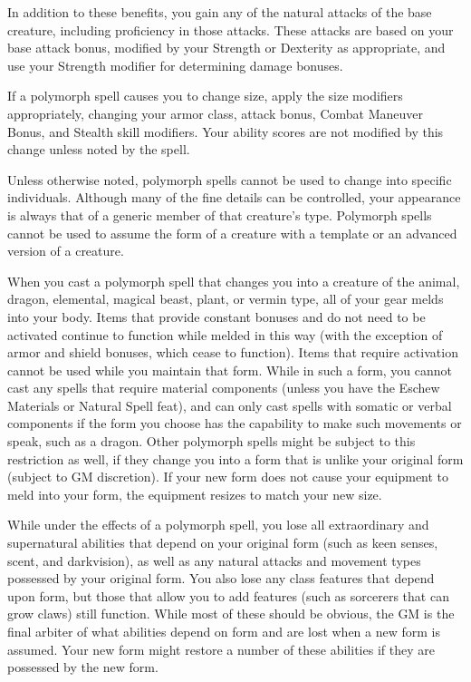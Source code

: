 In addition to these benefits, you gain any of the natural attacks of the base creature, including proficiency in those attacks. These attacks are based on your base attack bonus, modified by your Strength or Dexterity as appropriate, and use your Strength modifier for determining damage bonuses.
				
If a polymorph spell causes you to change size, apply the size modifiers appropriately, changing your armor class, attack bonus, Combat Maneuver Bonus, and Stealth skill modifiers. Your ability scores are not modified by this change unless noted by the spell.
				
Unless otherwise noted, polymorph spells cannot be used to change into specific individuals. Although many of the fine details can be controlled, your appearance is always that of a generic member of that creature's type. Polymorph spells cannot be used to assume the form of a creature with a template or an advanced version of a creature.
				
When you cast a polymorph spell that changes you into a creature of the animal, dragon, elemental, magical beast, plant, or vermin type, all of your gear melds into your body. Items that provide constant bonuses and do not need to be activated continue to function while melded in this way (with the exception of armor and shield bonuses, which cease to function). Items that require activation cannot be used while you maintain that form. While in such a form, you cannot cast any spells that require material components (unless you have the Eschew Materials or Natural Spell feat), and can only cast spells with somatic or verbal components if the form you choose has the capability to make such movements or speak, such as a dragon. Other polymorph spells might be subject to this restriction as well, if they change you into a form that is unlike your original form (subject to GM discretion). If your new form does not cause your equipment to meld into your form, the equipment resizes to match your new size. 
				
While under the effects of a polymorph spell, you lose all extraordinary and supernatural abilities that depend on your original form (such as keen senses, scent, and darkvision), as well as any natural attacks and movement types possessed by your original form. You also lose any class features that depend upon form, but those that allow you to add features (such as sorcerers that can grow claws) still function. While most of these should be obvious, the GM is the final arbiter of what abilities depend on form and are lost when a new form is assumed. Your new form might restore a number of these abilities if they are possessed by the new form.
				
